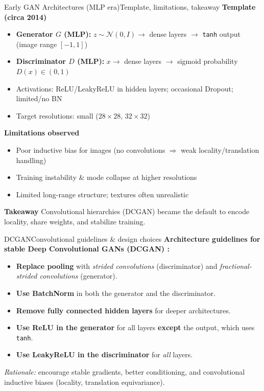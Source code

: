 \begin{frame}{Early GAN Architectures (MLP era)}{Template, limitations, takeaway}
    \textbf{Template (circa 2014)}
    \begin{itemize}
        \item \textbf{Generator $G$ (MLP):} $z\sim\mathcal N(0,I)\to$ dense layers $\to$ \texttt{tanh} output (image range $[-1,1]$)
        \item \textbf{Discriminator $D$ (MLP):} $x\to$ dense layers $\to$ sigmoid probability $D(x)\in(0,1)$
        \item Activations: ReLU/LeakyReLU in hidden layers; occasional Dropout; limited/no BN
        \item Target resolutions: small ($28\times28$, $32\times32$)
    \end{itemize}
    \vskip 6pt
    \textbf{Limitations observed}
    \begin{itemize}
        \item Poor inductive bias for images (no convolutions $\Rightarrow$ weak locality/translation handling)
        \item Training instability \& mode collapse at higher resolutions
        \item Limited long-range structure; textures often unrealistic
    \end{itemize}
    \vskip 4pt
    \textbf{Takeaway} \; Convolutional hierarchies (DCGAN) became the default to encode locality, share weights, and stabilize training.
\end{frame}

\begin{frame}{DCGAN}{Convolutional guidelines \& design choices}
    \textbf{Architecture guidelines for stable Deep Convolutional GANs (DCGAN) \citep{radford_unsupervised_2016}:}
    \begin{itemize}
        \item \textbf{Replace pooling} with \emph{strided convolutions} (discriminator) and \emph{fractional-strided convolutions} (generator).
        \item \textbf{Use BatchNorm} in both the generator and the discriminator.
        \item \textbf{Remove fully connected hidden layers} for deeper architectures.
        \item \textbf{Use ReLU in the generator} for all layers \textbf{except} the output, which uses \texttt{tanh}.
        \item \textbf{Use LeakyReLU in the discriminator} for \emph{all} layers.
    \end{itemize}
    \vskip 6pt
    \textit{Rationale:} encourage stable gradients, better conditioning, and convolutional inductive biases (locality, translation equivariance).
\end{frame}

